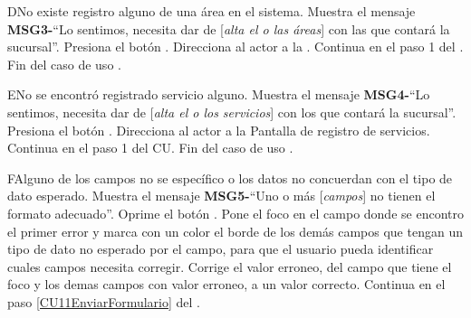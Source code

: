 		\begin{UCtrayectoriaA}{D}{No existe registro alguno de una área en el sistema.}
			\UCpaso Muestra el mensaje {\bf MSG3-}``Lo sentimos, necesita dar de [{\em alta el o las áreas}] con las que contará la sucursal''.
			\UCpaso[\UCactor] Presiona el botón .
			\UCpaso Direcciona al actor a la .
			\UCpaso Continua en el paso 1 del .
			Fin del caso de uso .
		\end{UCtrayectoriaA}

		\begin{UCtrayectoriaA}{E}{No se encontró registrado servicio alguno.}
			\UCpaso Muestra el mensaje {\bf MSG4-}``Lo sentimos, necesita dar de [{\em alta el o los servicios}] con los que contará la sucursal''.
			\UCpaso[\UCactor] Presiona el botón .
			\UCpaso Direcciona al actor a la Pantalla de registro de servicios.
			\UCpaso Continua en el paso 1 del CU.
			Fin del caso de uso .
		\end{UCtrayectoriaA}		
		
		\begin{UCtrayectoriaA}{F}{Alguno de los campos no se específico o los datos no concuerdan con el tipo de dato esperado.}
			\UCpaso Muestra el mensaje {\bf MSG5-}``Uno o más [{\em campos}] no tienen el formato adecuado''.
			\UCpaso[\UCactor] Oprime el botón .
			\UCpaso Pone el foco en el campo donde se encontro el primer error y marca con un color el borde de los demás campos que tengan un tipo de dato no esperado por el campo, para que el usuario pueda identificar cuales campos necesita corregir. 
			\UCpaso[\UCactor] Corrige el valor erroneo, del campo que tiene el foco y los demas campos con valor erroneo, a un valor correcto.
			\UCpaso Continua en el paso \ref{CU11EnviarFormulario} del .
		\end{UCtrayectoriaA}
		
